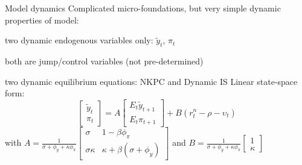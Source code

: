 \documentclass{beamer}
\newenvironment{mytemize}
{\vfill\itemize[nolistsep,itemsep=\fill,label=\color{blue}{$\triangleright$}]}
  {\enditemize}
\begin{document}
\begin{frame}{Model dynamics}
  Complicated micro-foundations, but very simple dynamic properties of model:
  \begin{mytemize}
  \item two dynamic endogenous variables only: $\tilde y_t$, $\pi_t$ 	
  \item both are jump/control variables (not pre-determined)
  \item two dynamic equilibrium equations: NKPC and Dynamic IS
  \end{mytemize}
  \vfill
  Linear state-space form:
  $$
  \begin{bmatrix}
	\tilde y_t \\ \pi_t
  \end{bmatrix} 
  = A
  \begin{bmatrix}
    E_t \tilde y_{t+1} \\ E_t \pi_{t+1}
  \end{bmatrix} 
  + B (r^n_t - \rho - \upsilon_t)
  $$
with $A = \frac{1}{\sigma+\phi_y+\kappa \phi_\pi}
\begin{bmatrix}
  \sigma & 1-\beta \phi_\pi \\ \sigma \kappa & \kappa + \beta (\sigma+\phi_y)
\end{bmatrix}
$  and $B = \frac{1}{\sigma+\phi_y+\kappa \phi_\pi}
\begin{bmatrix}
  1 \\ \kappa
\end{bmatrix}
$
\end{frame}
\end{document}
